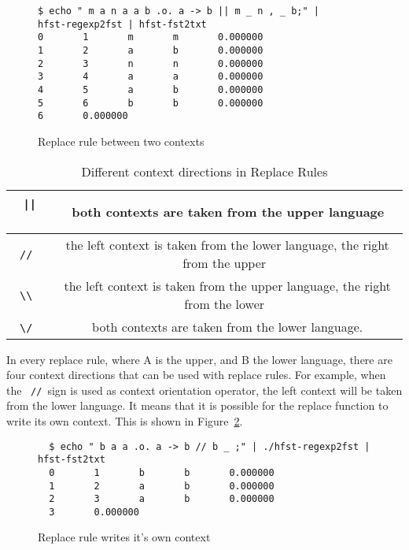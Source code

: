 \documentclass{llncs}
\begin{document}
\begin{figure} [h!]
\begin{verbatim}
$ echo " m a n a a b .o. a -> b || m _ n , _ b;" |
hfst-regexp2fst | hfst-fst2txt
0       1       m       m       0.000000
1       2       a       b       0.000000
2       3       n       n       0.000000
3       4       a       a       0.000000
4       5       a       b       0.000000
5       6       b       b       0.000000
6       0.000000
\end{verbatim}
\caption{Replace rule between two contexts}
\label{fig:multiple_contexts}
\end{figure}

\begin{table} [h!]
  \centering
  \caption{Different context directions in Replace Rules}
  \begin{tabular}{ | c | c | }
    \hline
    \ \verb!||!\ & \ both contexts are taken from the upper language \\ \hline
    \ \verb!//!\ & \ the left context is taken from the lower language, the right from the upper \\ \hline
    \ \verb!\\!\ & \ the left context is taken from the upper language, the right from the lower \\ \hline
    \ \verb!\/!\ & \ both contexts are taken from the lower language. \\ \hline
  \end{tabular}
  \label{tab:context_directions}
\end{table}

In every replace rule, where A is the upper, and B the lower language, 
there are four context directions that can be used with replace rules. 
For example, when the \ \verb!//!\ sign is used as context orientation operator, 
the left context will be taken from the lower language. 
It means that it is possible for the replace function to write its own context. 
This is shown in Figure~\ref{fig:context_orientation}. 

\begin{figure} [h!]
\begin{verbatim}
  $ echo " b a a .o. a -> b // b _ ;" | ./hfst-regexp2fst | hfst-fst2txt
  0       1       b       b       0.000000
  1       2       a       b       0.000000
  2       3       a       b       0.000000
  3       0.000000
\end{verbatim}
\caption{Replace rule writes it's own context}
\label{fig:context_orientation}
\end{figure}
\end{document}
